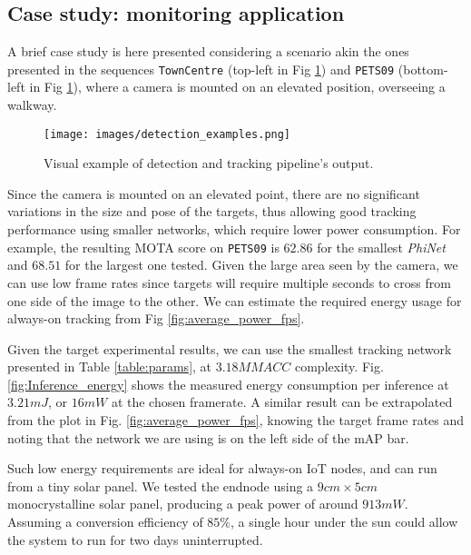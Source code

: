 \subsection{Case study: monitoring application}
\label{sec:example}
A brief case study is here presented considering a scenario akin the ones presented in the sequences \texttt{TownCentre}  (top-left in Fig \ref{fig:detresults_macc}) and \texttt{PETS09} (bottom-left in Fig \ref{fig:detresults_macc}), where a camera is mounted on an elevated position, overseeing a walkway.

\begin{figure}[h]
  \centering
  \texttt{[image: images/detection\_examples.png]}
  \caption{Visual example of detection and tracking pipeline's output.}
  \label{fig:detresults_macc}
\end{figure}

Since the camera is mounted on an elevated point, there are no significant variations in the size and pose of the targets, thus allowing good tracking performance using smaller networks, which require lower power consumption. For example, the resulting MOTA score on \texttt{PETS09} is $62.86$ for the smallest \textit{PhiNet} and $68.51$ for the largest one tested. Given the large area seen by the camera, we can use low frame rates since targets will require multiple seconds to cross from one side of the image to the other. We can estimate the required energy usage for always-on tracking from Fig \ref{fig:average_power_fps}.

Given the target experimental results, we can use the smallest tracking network presented in Table \ref{table:params}, at $3.18 MMACC$ complexity. Fig. \ref{fig:Inference_energy} shows the measured energy consumption per inference at $3.21 mJ$, or $16 mW$ at the chosen framerate. A similar result can be extrapolated from the plot in Fig. \ref{fig:average_power_fps}, knowing the target frame rates and noting that the network we are using is on the left side of the mAP bar.

Such low energy requirements are ideal for always-on IoT nodes, and can run from a tiny solar panel. We tested the endnode using a $9cm \times 5cm$ monocrystalline solar panel, producing a peak power of around $913mW$. Assuming a conversion efficiency of $85\%$, a single hour under the sun could allow the system to run for two days uninterrupted.


